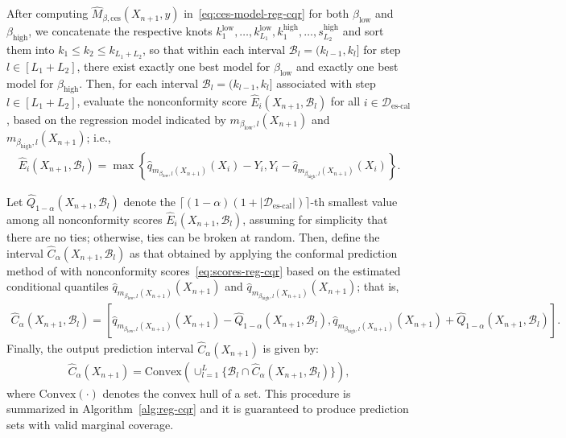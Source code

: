 After computing $\hat{M}_{\beta, \text{ces}}(X_{n+1},y)$ in~\eqref{eq:ces-model-reg-cqr} for both  $\beta_{\text{low}}$ and $\beta_{\text{high}}$, we concatenate the respective knots $k_1^{\text{low}}, \dots, k^{\text{low}}_{L_1}, k_1^{\text{high}}, \dots, s_{L_2}^{\text{high}}$ and sort them into $k_1 \leq k_2 \leq k_{L_1+L_2}$, so that within each interval $\mathcal{B}_l = (k_{l-1}, k_{l}]$ for step $l \in [L_1 + L_2]$, there exist exactly one best model for $\beta_{\text{low}}$ and exactly one best model for $\beta_{\text{high}}$. 
Then, for each interval $\mathcal{B}_l = (k_{l-1}, k_{l}]$ associated with step $l \in[L_1 + L_2]$, evaluate the nonconformity score $\hat{E}_i(X_{n+1}, \mathcal{B}_l)$ for all $i \in \mathcal{D}_{\text{es-cal}}$, based on the regression model indicated by $m_{\beta_{\text{low}},l}(X_{n+1})$ and $m_{\beta_{\text{high}},l}(X_{n+1})$; i.e.,
\begin{align} \label{eq:scores-reg-cqr}
  \hat{E}_i(X_{n+1}, \mathcal{B}_l) = \max\left\{\hat{q}_{m_{\beta_{\text{low}},l}(X_{n+1})}(X_i) - Y_i, Y_i - \hat{q}_{m_{\beta_{\text{high}},l}(X_{n+1})}(X_i)\right\}.
\end{align}


Let $\hat{Q}_{1-\alpha}(X_{n+1},\mathcal{B}_l)$ denote the $\lceil (1-\alpha)(1+|\mathcal{D}_{\text{es-cal}}|) \rceil$-th smallest value among all nonconformity scores $\hat{E}_i(X_{n+1},\mathcal{B}_l)$, assuming for simplicity that there are no ties; otherwise, ties can be broken at random. 
Then, define the interval $\hat{C}_{\alpha}(X_{n+1}, \mathcal{B}_l)$ as that obtained by applying the conformal prediction method of \citet{romano2019conformalized} with nonconformity scores~\eqref{eq:scores-reg-cqr} based on the estimated conditional quantiles $\hat{q}_{m_{\beta_{\text{low}},l}(X_{n+1})}(X_{n+1})$ and $\hat{q}_{m_{\beta_{\text{high}},l}(X_{n+1})}(X_{n+1})$; that is,
\begin{align} \label{eq:reg-int-tmp-cqr}
  \hat{C}_{\alpha}(X_{n+1}, \mathcal{B}_l) = [\hat{q}_{m_{\beta_{\text{low}},l}(X_{n+1})}(X_{n+1}) - \hat{Q}_{1-\alpha}(X_{n+1},\mathcal{B}_l), \hat{q}_{m_{\beta_{\text{high}},l}(X_{n+1})}(X_{n+1}) + \hat{Q}_{1-\alpha}(X_{n+1},\mathcal{B}_l)].
\end{align}
Finally, the output prediction interval $\hat{C}_{\alpha}(X_{n+1})$ is given by:
\begin{align} \label{eq:reg-int-cqr}
  \hat{C}_{\alpha}(X_{n+1}) = \text{Convex}\left( \cup_{l=1}^{L} \{ \mathcal{B}_l \cap \hat{C}_{\alpha}(X_{n+1}, \mathcal{B}_l) \} \right),
\end{align}
where $\text{Convex}(\cdot)$ denotes the convex hull of a set.
This procedure is summarized in Algorithm~\ref{alg:reg-cqr} and it is guaranteed to produce prediction sets with valid marginal coverage.

